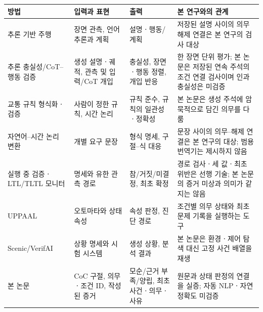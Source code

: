 \begin{revision}
\begin{table}[t]
\centering
\color{revisionblue}
\label{tab:related-position}
\scriptsize
\begin{tabularx}{\textwidth}{L{.21\textwidth}L{.24\textwidth}L{.24\textwidth}Y}
\toprule
방법 & 입력과 표현 & 출력 & 본 연구와의 관계 \\
\midrule
추론 기반 주행 \cite{sima2024drivelm,tian2024drivevlm,wang2025alpamayo} & 장면 관측, 언어 추론과 계획 & 설명ㆍ행동/계획 & 저장된 설명 사이의 의무 해제 연결은 본 연구의 검사 대상 \\
추론 충실성/CoT--행동 검증 \cite{turpin2023,lanham2023,yu2026drivethoughts,mayumu2026faithfulness,nguyen2026vladrivebench} & 생성 설명ㆍ궤적, 관측 및 입력/CoT 개입 & 충실성, 장면ㆍ행동 정렬, 개입 반응 & 한 장면 단위 평가; 본 논문은 저장된 연속 주석의 조건 연결 검사이며 인과 충실성은 미검증 \\
교통 규칙 형식화ㆍ검증 \cite{esterle2020,maierhofer2020,wan2024} & 사람이 정한 규칙, 시간 논리 & 규칙 준수, 규칙의 일관성ㆍ정확성 & 본 논문은 생성 주석에 암묵적으로 담긴 의무를 다룸 \\
자연어--시간 논리 변환 \cite{chen2023nl2tl,cosler2023nl2spec} & 개별 요구 문장 & 형식 명세, 구절--식 대응 & 문장 사이의 의무--해제 연결은 본 연구의 대상; 범용 번역기는 제시하지 않음 \\
실행 중 검증ㆍLTL/TLTL 모니터 \cite{leucker2009runtime,bauer2011runtime} & 명세와 유한 관측 경로 & 참/거짓/미결정, 최초 확정 & 경로 검사ㆍ세 값ㆍ최초 위반은 선행 기술; 본 논문의 증거 미상과 의미가 같지는 않음 \\
UPPAAL \cite{behrmann2004uppaal} & 오토마타와 상태 속성 & 속성 판정, 진단 경로 & 조건별 의무 상태와 최초 문제 기록을 실행하는 도구 \\
Scenic/VerifAI \cite{fremont2019scenic,dreossi2019verifai} & 상황 명세와 시험 시스템 & 생성 상황, 분석 결과 & 본 논문은 환경ㆍ제어 탐색 대신 고정 사건 배열을 재생 \\
본 논문 & CoC 구절, 의무ㆍ조건 ID, 작성된 증거 & 모순/근거 부족/양립, 최초 사건ㆍ의무ㆍ사유 & 원문과 상태 판정의 연결을 실증; 자동 NLPㆍ자연 정확도 미검증 \\
\bottomrule
\end{tabularx}
\end{table}
\end{revision}
